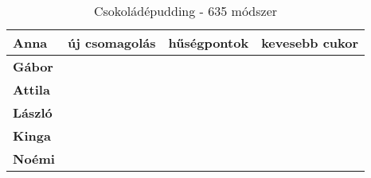 \begin{table}[H]
	\begin{center}
		\caption{Csokoládépudding - 635 módszer}
		\begin{tabular}{l|c|c|c}
		\textbf{Anna}   & új csomagolás 	                                                                & hűségpontok                                                           & kevesebb cukor \\
		\hline         
        \textbf{Gábor}  &  	& & \\
        \hline         
        \textbf{Attila} &   & & \\
        \hline         
        \textbf{László} &   & & \\
        \hline         
        \textbf{Kinga}  &   & & \\
        \hline         
        \textbf{Noémi}  &   & & \\
		\end{tabular}
	\end{center}
\end{table}